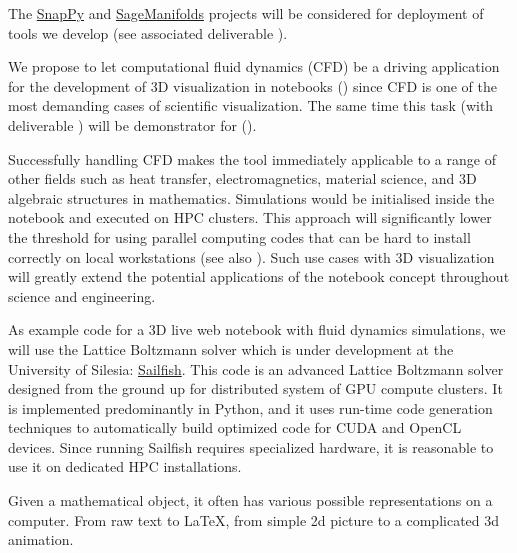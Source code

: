 \begin{workpackage}
\begin{tasklist}
\begin{task}[title=Visualization system for 3D data in web-notebook
,id=vis3d,lead=SR, partners={US,PS,USO}, PM=13, wphases=0-24]
The \href{http://www.math.uic.edu/t3m/SnapPy/}{SnapPy} and
\href{http://sagemanifolds.obspm.fr/}{SageManifolds} projects will be
considered for deployment of tools we develop (see associated
deliverable ).
\end{task}


\begin{task}[title=Visualization of 3D fluid dynamics data in web-notebook
,id=cfd-vis,lead=SR, partners={US,PS,USO},PM=5,wphases=12-36]

We propose to let computational fluid dynamics (CFD) be a driving
application for the development of 3D visualization in \Jupyter
notebooks () since CFD is one of the most demanding
cases of scientific visualization. The same time this task
(with deliverable ) will be
demonstrator for ().

Successfully handling CFD makes the tool immediately applicable to a
range of other fields such as heat transfer, electromagnetics,
material science, and 3D algebraic structures in
mathematics. Simulations would be initialised inside the notebook and
executed on HPC clusters. This approach will significantly lower the
threshold for using parallel computing codes that can be hard to
install correctly on local workstations (see also ). Such
use cases with 3D visualization will greatly extend the potential
applications of the \Jupyter notebook concept throughout science and
engineering.

As example code for a 3D live web notebook with fluid dynamics
simulations, we will use the Lattice Boltzmann solver which is under
development at the University of Silesia:
\href{http://sailfish.us.edu.pl/}{Sailfish}.  This code is an advanced
Lattice Boltzmann solver designed from the ground up for distributed
system of GPU compute clusters. It is implemented predominantly in
Python, and it uses run-time code generation techniques to
automatically build optimized code for CUDA and OpenCL devices. Since
running Sailfish requires specialized hardware, it is reasonable to
use it on dedicated HPC installations.
\end{task}

\begin{task}[lead=UB,title=Common option system for various displays
  in Sage,id=Sage-display,PM=12,partners={UB},wphases=0-24]
  Given a mathematical object, it often has various possible representations on a
  computer. From raw text to \LaTeX, from simple 2d picture to
  a complicated 3d animation.


\end{task}
\end{tasklist}
\end{workpackage}
